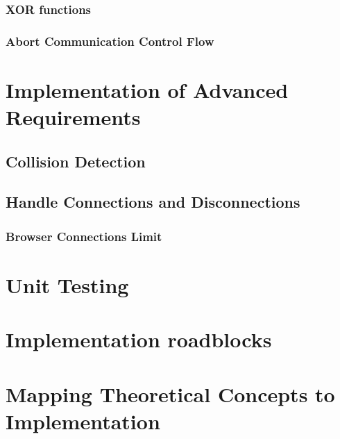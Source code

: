 \subsubsection{XOR functions}

\subsubsection{Abort Communication Control Flow}


\section{Implementation of Advanced Requirements}


\subsection{Collision Detection}


\subsection{Handle Connections and Disconnections}

\subsubsection{Browser Connections Limit}



\section{Unit Testing}

\section{Implementation roadblocks}


\section{Mapping Theoretical Concepts to Implementation}